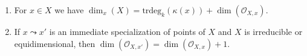 \begin{lemma}
\begin{enumerate}
\begin{enumerate}
\item $\text{trdeg}_k(\kappa(x)) > \text{trdeg}_k(\kappa(x'))$, and
\item any maximal chain of nontrivial specializations
$x = x_0 \leadsto x_1 \leadsto \ldots \leadsto x_n = x'$ has
length $n = \text{trdeg}_k(\kappa(x)) - \text{trdeg}_k(\kappa(x'))$.
\end{enumerate}
\item
\label{item-dimension-formula}
For $x \in X$ we have
$\dim_x(X) = \text{trdeg}_k(\kappa(x)) + \dim(\mathcal{O}_{X, x})$.
\item
\label{item-immediate-specialization-local-ring}
If $x \leadsto x'$ is an immediate specialization
of points of $X$ and $X$ is irreducible or equidimensional, then
$\dim(\mathcal{O}_{X, x'}) = \dim(\mathcal{O}_{X, x}) + 1$.
\end{enumerate}
\end{lemma}

